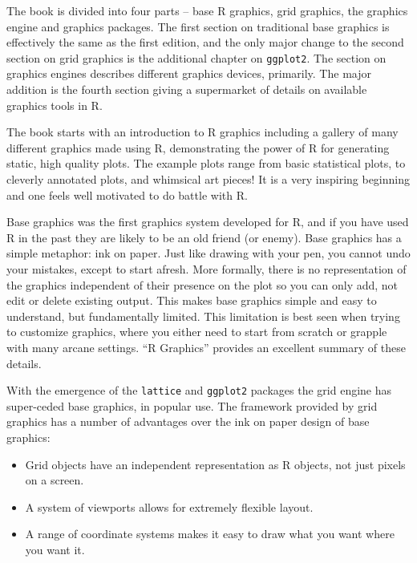 \documentclass[12pt]{article}
\begin{document}
The book is divided into four parts -- base R graphics, grid graphics,
the graphics engine and graphics packages. The first section on
traditional base graphics is effectively the same as the first edition, and the
only major change to the second section on grid graphics is the
additional chapter on \texttt{ggplot2}.  The section on graphics
engines describes different graphics devices, primarily. The major
addition is the fourth section giving a supermarket of details on
available graphics tools in R.

The book starts with an introduction to R graphics including a gallery
of many different graphics made using R, demonstrating the power of R
for generating static, high quality plots. The example plots range
from basic statistical plots, to cleverly annotated plots, and
whimsical art pieces! It is a very inspiring beginning and one feels
well motivated to do battle with R.

Base graphics was the first graphics system developed for R, and if
you have used R in the past they are likely to be an old friend (or
enemy). Base graphics has a simple metaphor: ink on paper. Just like
drawing with your pen, you cannot undo your mistakes, except to start
afresh. More formally, there is no representation of the graphics
independent of their presence on the plot so you can only add, not
edit or delete existing output. This makes base graphics simple and
easy to understand, but fundamentally limited.  This limitation is
best seen when trying to customize graphics, where you either need to
start from scratch or grapple with many arcane settings. ``R
Graphics'' provides an excellent summary of these details.

With the emergence of the \texttt{lattice} and \texttt{ggplot2}
packages the grid engine has super-ceded base graphics, in popular use.
The framework provided by grid graphics has a number of advantages
over the ink on paper design of base graphics:

\begin{itemize} \itemsep 0in

\item Grid objects have an independent representation as R objects,
not just pixels on a screen.

\item A system of viewports allows for extremely flexible layout.

\item A range of coordinate systems makes it easy to draw what you
want where you want it.

\end{itemize}
\end{document}
